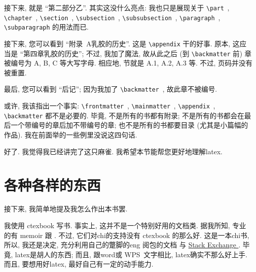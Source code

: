 接下来, 就是 ``第二部分\quad 乙''.
其实这没什么亮点:
我也只是展现关于
\verb`\part`~, \verb`\chapter`~,
\verb`\section`~, \verb`\subsection`~,
\verb`\subsubsection`~,
\verb`\paragraph`~, \verb`\subparagraph`
的用法而已.

接下来, 您可以看到 ``附录~A\quad 乳胶的历史''.
这是 \verb`\appendix` 干的好事.
原本, 这应当是 ``第四章\quad 乳胶的历史'';
不过, 我加了魔法, 故从此之后 (到 \verb`\backmatter` 前)
章被编号为 A, B, C 等大写字母.
相应地, 节就是 A.1, A.2, A.3 等.
不过, 页码并没有被重置.

最后, 您可以看到 ``后记'';
因为我加了 \verb`\backmatter`~, 故此章不被编号.

或许, 我该指出一个事实:
\verb`\frontmatter`~, \verb`\mainmatter`~,
\verb`\appendix`~, \verb`\backmatter`
都不是必要的.
毕竟, 不是所有的书都有附录;
不是所有的书都会在最后一个带编号的章后加不带编号的章;
也不是所有的书都要目录 (尤其是小篇幅的作品).
我在前面举的一些例里没说这四句话.

好了.
我觉得我已经讲完了这只麻雀.
我希望本节能帮您更好地理解\gls{latex}.

\section{各种各样的东西}

接下来, 我简单地提及我怎么作出本书罢.

我使用 \textsf{ctexbook} 写书.
事实上, 这并不是一个特别好用的文档类.
据我所知, 专业的有 \textsf{memoir} 跟 .
不过, 它们对\gls{chi}的支持没有 \textsf{ctexbook} 的那么好.
这是一本\gls{chi}书,
所以, 我还是决定,
充分利用自己的蹩脚的\gls{eng}%
阅包的文档%
与
\href{https://tex.stackexchange.com/questions/}{%
     Stack Exchange%
}.
毕竟, \gls{latex}是胡人的东西;
而且, 跟\gls{word}或 WPS~文字相比,
\gls{latex}确实不那么好上手.
而且, 要想用好\gls{latex}, 最好自己有一定的动手能力.


